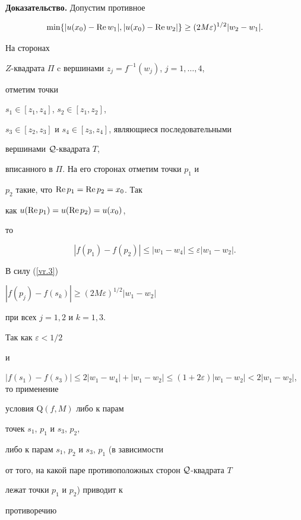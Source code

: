 {\bf Доказательство.} Допустим противное


\begin{equation}


\label{vr.3}


\min \{ |u(x_0) - \re w_1|, |u(x_0) - \re w_2| \} \geq


(2M\varepsilon)^{1/2} |w_2 - w_1|.


\end{equation}


На сторонах 


$Z$-квадрата $\Pi$ c вершинами $z_j = f^{-1}(w_j)$, $j=1,\dotsc,4$, 


отметим точки 


$s_1 \in [z_1,z_4]$, $s_2\in [z_1,z_2]$, 


$s_3\in [z_2,z_3]$ и $s_4 \in [z_3, z_4]$, являющиеся последовательными 


вершинами ${\cal Q}$-квадрата $T$, 


вписанного в $\Pi$. На его сторонах отметим точки $p_1$ и 


$p_2$ такие, что $\operatorname{Re} p_1 = \operatorname{Re} p_2 = x_0$. Так 


как $ u(\operatorname{Re} p_1) = u(\operatorname{Re} p_2) = u(x_0)$, 


то 


$$


|f(p_1) - f(p_2)| \leq |w_1 - w_4| \leq \varepsilon |w_1 - w_2|.


$$ 


В силу (\ref{vr.3}) 


$|f(p_j) - f(s_k)| \geq (2M\varepsilon)^{1/2} |w_1 - w_2|$


при всех $j=1,2$ и $k=1,3$.


Так как $\varepsilon < 1/2$


и


$|f(s_1) - f(s_3)| \leq 2|w_1 - w_4| + |w_1 - w_2| \leq 


(1+2\varepsilon) |w_1 - w_2| < 2|w_1 - w_2|$, то применение 


условия Q$(f,M)$ либо к парам 


точек $s_1$, $p_1$ и $s_3$, $p_2$,


либо к парам $s_1$, $p_2$ и $s_3$, $p_1$ (в зависимости 


от того, на какой паре противоположных сторон ${\cal Q}$-квадрата $T$ 


лежат точки $p_1$ и $p_2$) приводит к 


противоречию


$$


